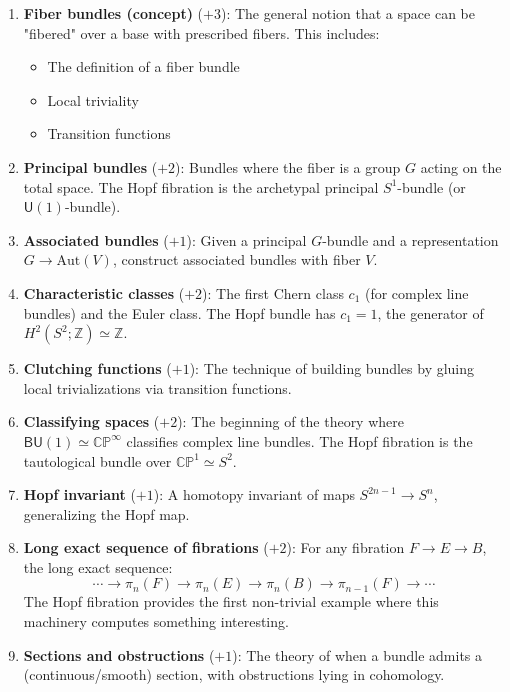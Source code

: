 \documentclass[11pt]{article}
\theoremstyle{definition}
\begin{document}
\begin{enumerate}
\item \textbf{Fiber bundles (concept)} ($+3$): The general notion that a space can be "fibered" over a base with prescribed fibers. This includes:
\begin{itemize}
\item The definition of a fiber bundle
\item Local triviality
\item Transition functions
\end{itemize}

\item \textbf{Principal bundles} ($+2$): Bundles where the fiber is a group $G$ acting on the total space. The Hopf fibration is the archetypal principal $S^1$-bundle (or $\mathsf{U}(1)$-bundle).

\item \textbf{Associated bundles} ($+1$): Given a principal $G$-bundle and a representation $G \to \text{Aut}(V)$, construct associated bundles with fiber $V$.

\item \textbf{Characteristic classes} ($+2$): The first Chern class $c_1$ (for complex line bundles) and the Euler class. The Hopf bundle has $c_1 = 1$, the generator of $H^2(S^2; \mathbb{Z}) \simeq \mathbb{Z}$.

\item \textbf{Clutching functions} ($+1$): The technique of building bundles by gluing local trivializations via transition functions.

\item \textbf{Classifying spaces} ($+2$): The beginning of the theory where $\mathsf{BU}(1) \simeq \mathbb{CP}^\infty$ classifies complex line bundles. The Hopf fibration is the tautological bundle over $\mathbb{CP}^1 \simeq S^2$.

\item \textbf{Hopf invariant} ($+1$): A homotopy invariant of maps $S^{2n-1} \to S^n$, generalizing the Hopf map.

\item \textbf{Long exact sequence of fibrations} ($+2$): For any fibration $F \to E \to B$, the long exact sequence:
\[
\cdots \to \pi_n(F) \to \pi_n(E) \to \pi_n(B) \to \pi_{n-1}(F) \to \cdots
\]
The Hopf fibration provides the first non-trivial example where this machinery computes something interesting.

\item \textbf{Sections and obstructions} ($+1$): The theory of when a bundle admits a (continuous/smooth) section, with obstructions lying in cohomology.


\end{enumerate}
\end{document}
